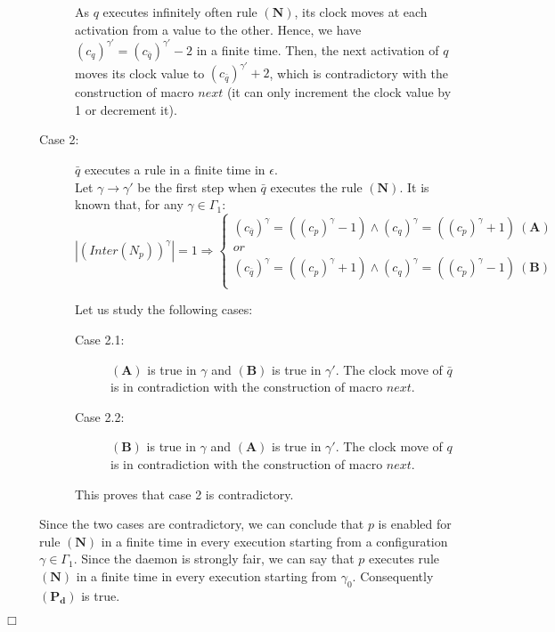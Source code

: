 \documentclass[11pt,english,letterpaper]{article}
\newenvironment{proof}{{\noindent\bf Proof. } }{{\hfill $\Box$}}
\begin{document}
\begin{proof}
\begin{description}
\begin{description}
As $q$ executes infinitely often rule $\boldsymbol{(N)}$, its clock moves at each activation from a value to the other. Hence, we have $\left(c_{q}\right)^{\gamma'}=\left(c_{\bar{q}}\right)^{\gamma'}-2$ in a finite time. Then, the next activation of $q$ moves its clock value to $\left(c_{\bar{q}}\right)^{\gamma'}+2$, which is contradictory with the construction of macro $next$ (it can only increment the clock value by 1 or decrement it).

\item[Case 2:] $\bar{q}$ executes a rule in a finite time in $\epsilon$.\\
Let $\gamma\rightarrow\gamma'$ be the first step when $\bar{q}$ executes the rule $\boldsymbol{(N)}$. It is known that, for any $\gamma\in\Gamma_{1}$:
\[|\left(Inter(N_{p})\right)^{\gamma}|=1\Rightarrow\begin{cases}
\left(c_{\bar{q}}\right)^{\gamma}=(\left(c_{p}\right)^{\gamma}-1)\wedge\left(c_{q}\right)^{\gamma}=(\left(c_{p}\right)^{\gamma}+1)\:\boldsymbol{(A)}\\
or\\
\left(c_{\bar{q}}\right)^{\gamma}=(\left(c_{p}\right)^{\gamma}+1)\wedge\left(c_{q}\right)^{\gamma}=(\left(c_{p}\right)^{\gamma}-1)\:\boldsymbol{(B)}\\
\end{cases}\]

Let us study the following cases:
\begin{description}
\item[Case 2.1:] $\boldsymbol{(A)}$ is true in $\gamma$ and $\boldsymbol{(B)}$ is true in $\gamma'$.	The clock move of $\bar{q}$ is in contradiction with the construction of macro $next$.

\item[Case 2.2:] $\boldsymbol{(B)}$ is true in $\gamma$ and $\boldsymbol{(A)}$ is true in $\gamma'$.	The clock move of $q$ is in contradiction with the construction of macro $next$.
\end{description}

This proves that case 2 is contradictory.
\end{description}

Since the two cases are contradictory, we can conclude that $p$ is enabled for rule $\boldsymbol{(N)}$ in a finite time in every execution starting from a configuration $\gamma\in\Gamma_{1}$. Since the daemon is strongly fair, we can say that $p$ executes rule $\boldsymbol{(N)}$ in a finite time in every execution starting from $\gamma_{0}$. Consequently $\boldsymbol{(P_{d})}$ is true.
\end{description}
\end{proof}
\end{document}
